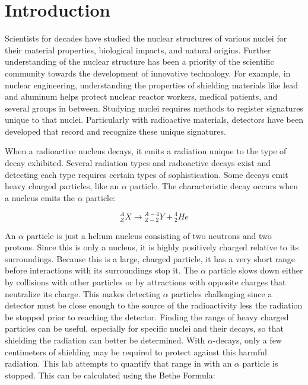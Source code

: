 \section{Introduction}

Scientists for decades have studied the nuclear structures of various nuclei for their material properties, biological impacts, and natural origins. Further understanding of the nuclear structure has been a priority of the scientific community towards the development of innovative technology. For example, in nuclear engineering, understanding the properties of shielding materials like lead and aluminum helps protect nuclear reactor workers, medical patients, and several groups in between. Studying nuclei requires methods to register signatures unique to that nuclei. Particularly with radioactive materials, detectors have been developed that record and recognize these unique signatures.

When a radioactive nucleus decays, it emits a radiation unique to the type of decay exhibited. Several radiation types and radioactive decays exist and detecting each type requires certain types of sophistication. Some decays emit heavy charged particles, like an $\alpha$ particle. The characteristic decay occurs when a nucleus emits the $\alpha$ particle:

\begin{equation}
{}^{A}_{Z}X \rightarrow {}^{A-4}_{Z-2}Y + {}^{4}_{2}{He}
\end{equation}

An $\alpha$ particle is just a helium nucleus consisting of two neutrons and two protons. Since this is only a nucleus, it is highly positively charged relative to its surroundings. Because this is a large, charged particle, it has a very short range before interactions with its surroundings stop it. The $\alpha$ particle slows down either by collisions with other particles or by attractions with opposite charges that neutralize its charge. This makes detecting $\alpha$ particles challenging since a detector must be close enough to the source of the radioactivity less the radiation be stopped prior to reaching the detector. Finding the range of heavy charged particles can be useful, especially for specific nuclei and their decays, so that shielding the radiation can better be determined. With $\alpha$-decays, only a few centimeters of shielding may be required to protect against this harmful radiation. This lab attempts to quantify that range in with an $\alpha$ particle is stopped. This can be calculated using the Bethe Formula:

